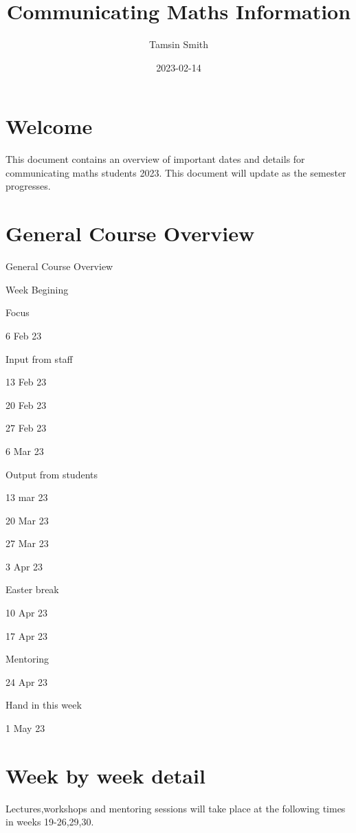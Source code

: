 \documentclass[
]{book}
\title{Communicating Maths Information}
\author{Tamsin Smith}
\date{2023-02-14}
\begin{document}
\maketitle

{
\setcounter{tocdepth}{1}
\tableofcontents
}
\hypertarget{welcome}{%
\chapter*{Welcome}\label{welcome}}

This document contains an overview of important dates and details for communicating maths students 2023. This document will update as the semester progresses.

\hypertarget{general-course-overview}{%
\chapter*{General Course Overview}\label{general-course-overview}}

General Course Overview

Week Begining

Focus

6 Feb 23

Input from staff

13 Feb 23

20 Feb 23

27 Feb 23

6 Mar 23

Output from students

13 mar 23

20 Mar 23

27 Mar 23

3 Apr 23

Easter break

10 Apr 23

17 Apr 23

Mentoring

24 Apr 23

Hand in this week

1 May 23

\hypertarget{week-by-week-detail}{%
\chapter*{Week by week detail}\label{week-by-week-detail}}

Lectures,workshops and mentoring sessions will take place at the following times in weeks 19-26,29,30.
\end{document}
